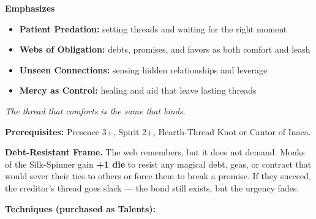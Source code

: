 \noindent\textbf{Emphasizes}
\begin{itemize}
  \item \textbf{Patient Predation:} setting threads and waiting for the right moment
  \item \textbf{Webs of Obligation:} debts, promises, and favors as both comfort and leash
  \item \textbf{Unseen Connections:} sensing hidden relationships and leverage
  \item \textbf{Mercy as Control:} healing and aid that leave lasting threads
\end{itemize}

\begin{tcolorbox}[colback=black!5,colframe=gray!70!white,title=\textbf{Silk-Spinner (Inaea)},breakable]
  \emph{The thread that comforts is the same that binds.}

  \vspace{2mm}
  \noindent\textbf{Prerequisites:} Presence 3+, Spirit 2+, Hearth-Thread Knot or Cantor of Inaea.

  \vspace{2mm}
  \noindent\textbf{Debt-Resistant Frame.} The web remembers, but it does not demand. Monks of the Silk-Spinner gain \textbf{+1 die} to resist any magical debt, geas, or contract that would sever their ties to others or force them to break a promise. If they succeed, the creditor's thread goes slack --- the bond still exists, but the urgency fades.

  \vspace{2mm}
  \noindent\textbf{Techniques (purchased as Talents):}


\end{tcolorbox}
